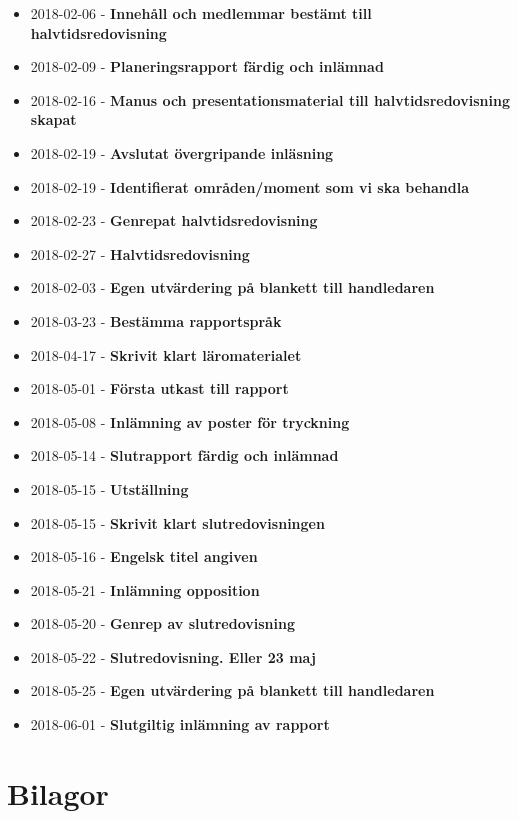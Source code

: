 \documentclass[12pt,a4paper]{article}
\begin{document}
\begin{itemize}
  \item 2018-02-06 - \textbf{Innehåll och medlemmar bestämt till halvtidsredovisning}
    \item 2018-02-09 - \textbf{Planeringsrapport färdig och inlämnad}
    \item 2018-02-16 - \textbf{Manus och presentationsmaterial till halvtidsredovisning skapat}
    \item 2018-02-19 - \textbf{Avslutat övergripande inläsning}
    \item 2018-02-19 - \textbf{Identifierat områden/moment som vi ska behandla}
    \item 2018-02-23 - \textbf{Genrepat halvtidsredovisning}
    \item 2018-02-27 - \textbf{Halvtidsredovisning}
    \item 2018-02-03 - \textbf{Egen utvärdering på blankett till handledaren}
    \item 2018-03-23 - \textbf{Bestämma rapportspråk}
    \item 2018-04-17 - \textbf{Skrivit klart läromaterialet}
    \item 2018-05-01 - \textbf{Första utkast till rapport}
    \item 2018-05-08 - \textbf{Inlämning av poster för tryckning}
    \item 2018-05-14 - \textbf{Slutrapport färdig och inlämnad}
    \item 2018-05-15 - \textbf{Utställning}
    \item 2018-05-15 - \textbf{Skrivit klart slutredovisningen}
    \item 2018-05-16 - \textbf{Engelsk titel angiven}
    \item 2018-05-21 - \textbf{Inlämning opposition}
    \item 2018-05-20 - \textbf{Genrep av slutredovisning}
    \item 2018-05-22 - \textbf{Slutredovisning. Eller 23 maj}
    \item 2018-05-25 - \textbf{Egen utvärdering på blankett till handledaren}
    \item 2018-06-01 - \textbf{Slutgiltig inlämning av rapport}
\end{itemize}


\newpage
{}

 


\newpage
\section*{Bilagor}
\label{sec:bilaga}
\end{document}
